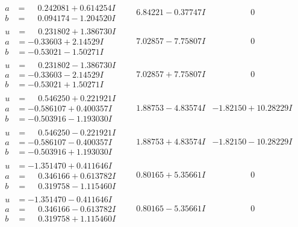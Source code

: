 \documentclass[1p]{elsarticle_modified}
\theoremstyle{definition}
\begin{document}
$$\begin{array}{c|c|c}
\begin{aligned}
a &= \phantom{-}0.242081 + 0.614254 I \\
b &= \phantom{-}0.094174 - 1.204520 I\end{aligned}
 & \phantom{-}6.84221 - 0.37747 I & \phantom{-0.000000 } 0 \\ \hline\begin{aligned}
u &= \phantom{-}0.231802 + 1.386730 I \\
a &= -0.33603 + 2.14529 I \\
b &= -0.53021 - 1.50271 I\end{aligned}
 & \phantom{-}7.02857 - 7.75807 I & \phantom{-0.000000 } 0 \\ \hline\begin{aligned}
u &= \phantom{-}0.231802 - 1.386730 I \\
a &= -0.33603 - 2.14529 I \\
b &= -0.53021 + 1.50271 I\end{aligned}
 & \phantom{-}7.02857 + 7.75807 I & \phantom{-0.000000 } 0 \\ \hline\begin{aligned}
u &= \phantom{-}0.546250 + 0.221921 I \\
a &= -0.586107 + 0.400357 I \\
b &= -0.503916 - 1.193030 I\end{aligned}
 & \phantom{-}1.88753 - 4.83574 I & -1.82150 + 10.28229 I \\ \hline\begin{aligned}
u &= \phantom{-}0.546250 - 0.221921 I \\
a &= -0.586107 - 0.400357 I \\
b &= -0.503916 + 1.193030 I\end{aligned}
 & \phantom{-}1.88753 + 4.83574 I & -1.82150 - 10.28229 I \\ \hline\begin{aligned}
u &= -1.351470 + 0.411646 I \\
a &= \phantom{-}0.346166 + 0.613782 I \\
b &= \phantom{-}0.319758 - 1.115460 I\end{aligned}
 & \phantom{-}0.80165 + 5.35661 I & \phantom{-0.000000 } 0 \\ \hline\begin{aligned}
u &= -1.351470 - 0.411646 I \\
a &= \phantom{-}0.346166 - 0.613782 I \\
b &= \phantom{-}0.319758 + 1.115460 I\end{aligned}
 & \phantom{-}0.80165 - 5.35661 I & \phantom{-0.000000 } 0 \\ \hline\begin{aligned}

\end{aligned}
\end{array}$$
\end{document}
